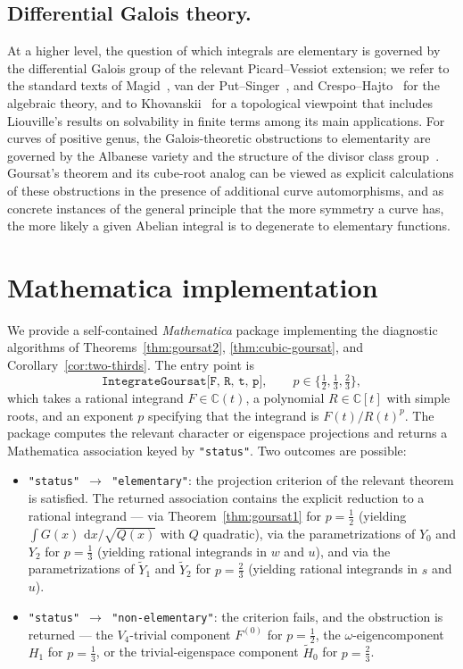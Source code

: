 \documentclass[11pt,a4paper]{article}
\theoremstyle{plain}
\theoremstyle{definition}
\theoremstyle{remark}
\newcommand{\C}{\mathbb{C}}
\renewcommand{\d}{\,\mathrm{d}}
\begin{document}
\subsection*{Differential Galois theory.}
At a higher level, the question of which integrals are elementary is governed by the differential Galois group of the relevant Picard--Vessiot extension; we refer to the standard texts of Magid~\cite{Magid1994}, van der Put--Singer~\cite{vanderPutSinger2003}, and Crespo--Hajto~\cite{CrespoHajto2011} for the algebraic theory, and to Khovanskii~\cite{Khovanskii2014} for a topological viewpoint that includes Liouville's results on solvability in finite terms among its main applications. For curves of positive genus, the Galois-theoretic obstructions to elementarity are governed by the Albanese variety and the structure of the divisor class group~\cite{Bertrand1990}. Goursat's theorem and its cube-root analog can be viewed as explicit calculations of these obstructions in the presence of additional curve automorphisms, and as concrete instances of the general principle that the more symmetry a curve has, the more likely a given Abelian integral is to degenerate to elementary functions.



\appendix
\section{Mathematica implementation}\label{sec:appendix}

We provide a self-contained \emph{Mathematica} package implementing the diagnostic algorithms of Theorems~\ref{thm:goursat2}, \ref{thm:cubic-goursat}, and Corollary~\ref{cor:two-thirds}. The entry point is
\[
  \texttt{IntegrateGoursat[F, R, t, p]},\qquad p\in\{\tfrac{1}{2},\tfrac{1}{3},\tfrac{2}{3}\},
\]
which takes a rational integrand $F\in\C(t)$, a polynomial $R\in\C[t]$ with simple roots, and an exponent $p$ specifying that the integrand is $F(t)/R(t)^p$. The package computes the relevant character or eigenspace projections and returns a Mathematica association keyed by \texttt{"status"}. Two outcomes are possible:
\begin{itemize}
  \item \texttt{"status"\,$\to$\,"elementary"}: the projection criterion of the relevant theorem is satisfied. The returned association contains the explicit reduction to a rational integrand --- via Theorem~\ref{thm:goursat1} for $p=\tfrac{1}{2}$ (yielding $\int G(x)\,\d x/\sqrt{Q(x)}$ with $Q$ quadratic), via the parametrizations of $Y_0$ and $Y_2$ for $p=\tfrac{1}{3}$ (yielding rational integrands in $w$ and $u$), and via the parametrizations of $\widetilde Y_1$ and $\widetilde Y_2$ for $p=\tfrac{2}{3}$ (yielding rational integrands in $s$ and $u$).
  \item \texttt{"status"\,$\to$\,"non-elementary"}: the criterion fails, and the obstruction is returned --- the $V_4$-trivial component $F^{(0)}$ for $p=\tfrac{1}{2}$, the $\omega$-eigencomponent $H_1$ for $p=\tfrac{1}{3}$, or the trivial-eigenspace component $\widetilde H_0$ for $p=\tfrac{2}{3}$.
\end{itemize}
\end{document}
